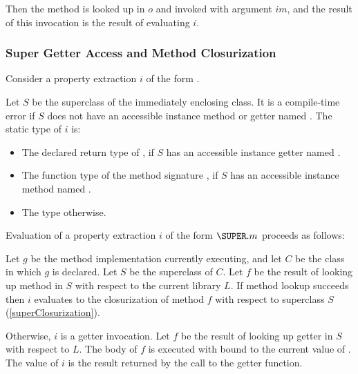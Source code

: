 \documentclass[makeidx]{article}
\begin{document}
\LMHash{}%
Then the method  is looked up in $o$ and invoked with argument $im$,
and the result of this invocation is the result of evaluating $i$.



\subsubsection{Super Getter Access and Method Closurization}

\LMHash{}%
Consider a property extraction $i$ of the form .

\LMHash{}%
Let $S$ be the superclass of the immediately enclosing class.
It is a compile-time error if $S$ does not have
an accessible instance method or getter named \id.
The static type of $i$ is:

\begin{itemize}
\item The declared return type of ,
  if $S$ has an accessible instance getter named \id.
\item The function type of the method signature ,
  if $S$ has an accessible instance method named \id.
\item The type \DYNAMIC{} otherwise.
\end{itemize}


\LMHash{}%
Evaluation of a property extraction $i$ of the form $\SUPER.m$ proceeds as follows:

\LMHash{}%
Let $g$ be the method implementation currently executing,
and let $C$ be the class in which $g$ is declared.
Let $S$ be the superclass of $C$.
Let $f$ be the result of looking up method \id{} in $S$
with respect to the current library $L$.
If method lookup succeeds then $i$ evaluates to
the closurization of method $f$
with respect to superclass $S$
(\ref{superClosurization}).

\LMHash{}%
Otherwise, $i$ is a getter invocation.
Let $f$ be the result of looking up
getter \id{} in $S$ with respect to $L$.
The body of $f$ is executed with \THIS{} bound to the current value of \THIS{}.
The value of $i$ is the result returned by the call to the getter function.
\end{document}

